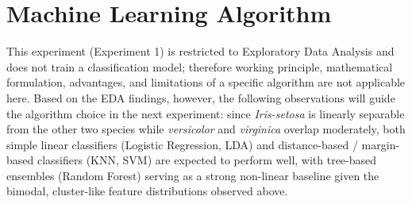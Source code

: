 \documentclass[12pt,a4paper]{article}
\begin{document}
\section{Machine Learning Algorithm}
This experiment (Experiment 1) is restricted to Exploratory Data Analysis and does not train a classification model; therefore working principle, mathematical formulation, advantages, and limitations of a specific algorithm are not applicable here. Based on the EDA findings, however, the following observations will guide the algorithm choice in the next experiment: since \textit{Iris-setosa} is linearly separable from the other two species while \textit{versicolor} and \textit{virginica} overlap moderately, both simple linear classifiers (Logistic Regression, LDA) and distance-based / margin-based classifiers (KNN, SVM) are expected to perform well, with tree-based ensembles (Random Forest) serving as a strong non-linear baseline given the bimodal, cluster-like feature distributions observed above.
\end{document}
